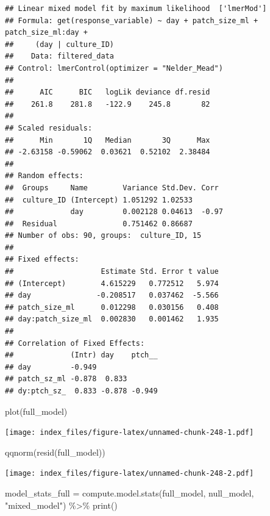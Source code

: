 \documentclass[
]{article}
\newenvironment{Shaded}{\begin{snugshade}}{\end{snugshade}}
\newcommand{\FunctionTok}[1]{\textcolor[rgb]{0.00,0.00,0.00}{#1}}
\newcommand{\NormalTok}[1]{#1}
\newcommand{\OtherTok}[1]{\textcolor[rgb]{0.56,0.35,0.01}{#1}}
\newcommand{\SpecialCharTok}[1]{\textcolor[rgb]{0.00,0.00,0.00}{#1}}
\newcommand{\StringTok}[1]{\textcolor[rgb]{0.31,0.60,0.02}{#1}}
\begin{document}
\begin{verbatim}
## Linear mixed model fit by maximum likelihood  ['lmerMod']
## Formula: get(response_variable) ~ day + patch_size_ml + patch_size_ml:day +  
##     (day | culture_ID)
##    Data: filtered_data
## Control: lmerControl(optimizer = "Nelder_Mead")
## 
##      AIC      BIC   logLik deviance df.resid 
##    261.8    281.8   -122.9    245.8       82 
## 
## Scaled residuals: 
##      Min       1Q   Median       3Q      Max 
## -2.63158 -0.59062  0.03621  0.52102  2.38484 
## 
## Random effects:
##  Groups     Name        Variance Std.Dev. Corr 
##  culture_ID (Intercept) 1.051292 1.02533       
##             day         0.002128 0.04613  -0.97
##  Residual               0.751462 0.86687       
## Number of obs: 90, groups:  culture_ID, 15
## 
## Fixed effects:
##                    Estimate Std. Error t value
## (Intercept)        4.615229   0.772512   5.974
## day               -0.208517   0.037462  -5.566
## patch_size_ml      0.012298   0.030156   0.408
## day:patch_size_ml  0.002830   0.001462   1.935
## 
## Correlation of Fixed Effects:
##             (Intr) day    ptch__
## day         -0.949              
## patch_sz_ml -0.878  0.833       
## dy:ptch_sz_  0.833 -0.878 -0.949
\end{verbatim}

\begin{Shaded}
\begin{Highlighting}[]
\FunctionTok{plot}\NormalTok{(full\_model)}
\end{Highlighting}
\end{Shaded}

\texttt{[image: index\_files/figure-latex/unnamed-chunk-248-1.pdf]}

\begin{Shaded}
\begin{Highlighting}[]
\FunctionTok{qqnorm}\NormalTok{(}\FunctionTok{resid}\NormalTok{(full\_model))}
\end{Highlighting}
\end{Shaded}

\texttt{[image: index\_files/figure-latex/unnamed-chunk-248-2.pdf]}

\begin{Shaded}
\begin{Highlighting}[]
\NormalTok{model\_stats\_full }\OtherTok{=} \FunctionTok{compute.model.stats}\NormalTok{(full\_model,}
\NormalTok{                                       null\_model,}
                                       \StringTok{"mixed\_model"}\NormalTok{) }\SpecialCharTok{\%\textgreater{}\%}
  \FunctionTok{print}\NormalTok{()}
\end{Highlighting}
\end{Shaded}
\end{document}
